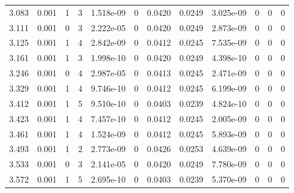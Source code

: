 \documentclass[preview]{standalone}
\begin{document}
{{{\begin{tabular}{L{1.2cm}C{1.2cm} C{0.3cm}C{0.5cm} C{1.4cm}C{1.4cm} C{1.4cm}C{1.4cm} C{1.6cm}C{1.6cm} C{1.6cm}C{1.6cm}}
  3.083  &  0.001  & 1     &  3 &  1.518e-09  & 0  &  0.0420&   0.0249& 3.025e-09 & 0   &  0 & 0  \\ 
  3.111  &  0.001  & 0     &  3 &  2.222e-05  & 0  &  0.0420&   0.0249& 2.873e-09 & 0   &  0 & 0  \\ 
  3.125  &  0.001  & 1     &  4 &  2.842e-09  & 0  &  0.0412&   0.0245& 7.535e-09 & 0   &  0 & 0  \\ 
  3.161  &  0.001  & 1     &  3 &  1.998e-10  & 0  &  0.0420&   0.0249& 4.398e-10 & 0   &  0 & 0  \\ 
  3.246  &  0.001  & 0     &  4 &  2.987e-05  & 0  &  0.0413&   0.0245& 2.471e-09 & 0   &  0 & 0  \\ 
  3.329  &  0.001  & 1     &  4 &  9.746e-10  & 0  &  0.0412&   0.0245& 6.199e-09 & 0   &  0 & 0  \\ 
  3.412  &  0.001  & 1     &  5 &  9.510e-10  & 0  &  0.0403&   0.0239& 4.824e-10 & 0   &  0 & 0  \\ 
  3.423  &  0.001  & 1     &  4 &  7.457e-10  & 0  &  0.0412&   0.0245& 2.005e-09 & 0   &  0 & 0  \\ 
  3.461  &  0.001  & 1     &  4 &  1.524e-09  & 0  &  0.0412&   0.0245& 5.893e-09 & 0   &  0 & 0  \\ 
  3.493  &  0.001  & 1     &  2 &  2.773e-09  & 0  &  0.0426&   0.0253& 4.639e-09 & 0   &  0 & 0  \\ 
  3.533  &  0.001  & 0     &  3 &  2.141e-05  & 0  &  0.0420&   0.0249& 7.780e-09 & 0   &  0 & 0  \\ 
  3.572  &  0.001  & 1     &  5 &  2.695e-10  & 0  &  0.0403&   0.0239& 5.370e-09 & 0   &  0 & 0  \\ 
\hline 
\end{tabular} 

}}}
\end{document}
